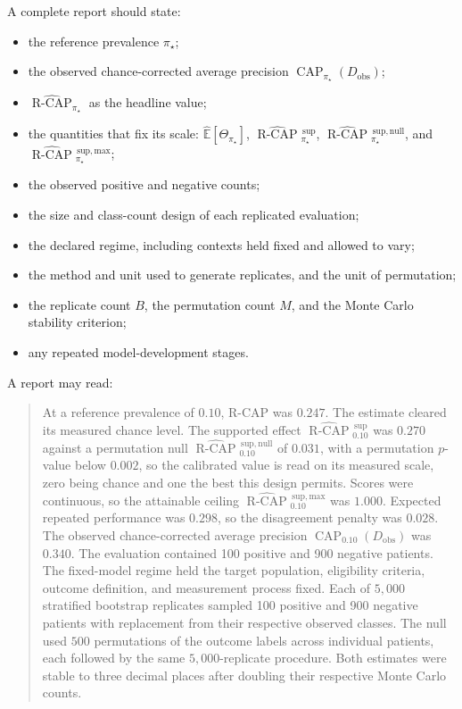\documentclass[11pt]{article}
\newcommand{\CAP}{\operatorname{CAP}}
\newcommand{\Tpi}{\CAP_{\pi_\star}}
\newcommand{\E}{\mathbb{E}}
\newcommand{\RCAPHat}{\widehat{\operatorname{R\text{-}CAP}}{}^{\,\mathrm{sup}}_{\pi_\star}}
\newcommand{\RCAPnullHat}{\widehat{\operatorname{R\text{-}CAP}}{}^{\,\mathrm{sup,null}}_{\pi_\star}}
\newcommand{\RCAPcalHat}{\widehat{\operatorname{R\text{-}CAP}}_{\pi_\star}}
\newcommand{\RCAPmaxHat}{\widehat{\operatorname{R\text{-}CAP}}{}^{\,\mathrm{sup,max}}_{\pi_\star}}
\theoremstyle{remark}
\begin{document}
A complete report should state:
\begin{itemize}
\item the reference prevalence $\pi_\star$;
\item the observed chance-corrected average precision $\Tpi(D_{\mathrm{obs}})$;
\item $\RCAPcalHat$ as the headline value;
\item the quantities that fix its scale:
      $\widehat{\E}[\Theta_{\pi_\star}]$, $\RCAPHat$,
      $\RCAPnullHat$, and $\RCAPmaxHat$;
\item the observed positive and negative counts;
\item the size and class-count design of each replicated evaluation;
\item the declared regime, including contexts held fixed and allowed to vary;
\item the method and unit used to generate replicates, and the unit of permutation;
\item the replicate count $B$, the permutation count $M$, and the Monte Carlo stability criterion;
\item any repeated model-development stages.
\end{itemize}

A report may read:
\begin{quote}
At a reference prevalence of $0.10$, R-CAP was $0.247$. The estimate cleared its measured chance level. The supported effect $\widehat{\operatorname{R\text{-}CAP}}{}^{\,\mathrm{sup}}_{0.10}$ was $0.270$ against a permutation null $\widehat{\operatorname{R\text{-}CAP}}{}^{\,\mathrm{sup,null}}_{0.10}$ of $0.031$, with a permutation $p$-value below $0.002$, so the calibrated value is read on its measured scale, zero being chance and one the best this design permits. Scores were continuous, so the attainable ceiling $\widehat{\operatorname{R\text{-}CAP}}{}^{\,\mathrm{sup,max}}_{0.10}$ was $1.000$. Expected repeated performance was $0.298$, so the disagreement penalty was $0.028$. The observed chance-corrected average precision $\CAP_{0.10}(D_{\mathrm{obs}})$ was $0.340$. The evaluation contained 100 positive and 900 negative patients. The fixed-model regime held the target population, eligibility criteria, outcome definition, and measurement process fixed. Each of $5{,}000$ stratified bootstrap replicates sampled 100 positive and 900 negative patients with replacement from their respective observed classes. The null used $500$ permutations of the outcome labels across individual patients, each followed by the same $5{,}000$-replicate procedure. Both estimates were stable to three decimal places after doubling their respective Monte Carlo counts.
\end{quote}
\end{document}
